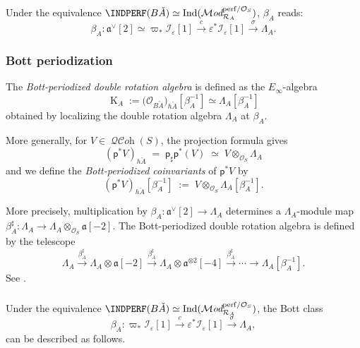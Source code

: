 \documentclass[12pt, oneside]{amsart}
\numberwithin{equation}{section}
\theoremstyle{remark}
\theoremstyle{plain}
\newcommand{\MOD}{\mathcal{M}\textit{od}}
\DeclareMathOperator{\QCOH}{\mathcal{QC}\textit{oh}}
\newcommand{\R}{\mathcal{R}}
\newcommand{\RA}{\R_A}
\newcommand{\fra}{\mathfrak{a}}
\newcommand{\frav}{\mathfrak{a}^\vee}
\newcommand{\lam}{\Lambda}
\newcommand{\OO}{\mathcal{O}}
\newcommand{\Ind}{\operatorname{Ind}}
\newcommand{\K}{\operatorname{K}}
\newcommand{\eps}{\varepsilon}
\newcommand{\sfp}{\mathsf{p}}
\begin{document}
\subsubsection{}

Under the equivalence $\INDPERF(B\check{A}) \simeq \Ind(\MOD_{\RA}^{\mathrm{perf}/\OO_S})$, $\beta_A$ reads:
\[
  \beta_A : \frav[2] \simeq \varpi_* \mathcal{I}_\eps[1] \xrightarrow{c} \eps^*  \mathcal{I}_\eps[1] \xrightarrow{\sigma} \lam_A.
\]

\subsubsection{Bott periodization}\label{sssec:Bott periodization}

The \emph{Bott-periodized double rotation algebra} is defined as the $E_\infty$-algebra
\begin{equation}
  \K_A := \bigl(\OO_{B\check{A}}\bigr)_{h\check{A}}[\beta_A^{-1}] \simeq \lam_A[\beta_A^{-1}]
\end{equation}
obtained by localizing the double rotation algebra $\lam_A$ at $\beta_A$.

More generally, for $V \in \QCOH(S)$, the projection formula gives
\[
  (\sfp^* V)_{h\check{A}} \;=\; \sfp_\sharp \sfp^* (V) \;\simeq\; V \otimes_{\OO_S} \lam_A
\]
and we define the \emph{Bott-periodized coinvariants} of $\sfp^* V$ by
\[
  (\sfp^* V)_{h\check{A}}[\beta_A^{-1}] \;:=\; V \otimes_{\OO_S} \lam_A[\beta_A^{-1}].
\]

More precisely, multiplication by $\beta_A : \frav[2] \to \lam_A$ determines a $\lam_A$-module map $\beta_A^{\sharp} : \lam_A \to \lam_A \otimes_{\OO_S} \fra[-2]$.
The Bott-periodized double rotation algebra is defined by the telescope
\[
  \lam_A
  \xrightarrow{\beta_A^\sharp} \lam_A \otimes \fra[-2]
  \xrightarrow{\beta_A^\sharp} \lam_A \otimes \fra^{\otimes 2}[-4]
  \xrightarrow{\beta_A^\sharp} \cdots
  \longrightarrow  \lam_A[\beta_A^{-1}].
\]
See \cite[Prop.~4.3.17]{LurieEll2}.

\subsubsection{}\label{sssec:Bott RA}

Under the equivalence $\INDPERF(B\check{A}) \simeq \Ind(\MOD_{\RA}^{\mathrm{perf}/\OO_S})$, the Bott class
\[
  \beta_A : \varpi_* \mathcal{I}_\eps[1] \xrightarrow{c} \eps^*  \mathcal{I}_\eps[1] \xrightarrow{\sigma} \lam_A,
\]
can be described as follows.
\end{document}
